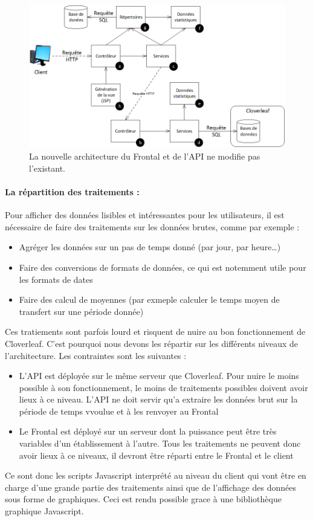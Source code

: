 			\begin{figure}[H]
				\centering
				\includegraphics[width=16cm]{../img/part3/archi_stats.png}
				\caption{\label{archi_stats} La nouvelle architecture du Frontal et de
				l'API ne modifie pas l'existant.}
			\end{figure}
			
			\paragraph{La répartition des traitements :}
			Pour afficher des données lisibles et intéressantes pour les utilisateurs, il
			est nécessaire de faire des traitements sur les données brutes, comme par
			exemple :
			\begin{itemize}
			  \item Agréger les données sur un pas de temps donné (par jour, par heure\ldots)
			  \item Faire des conversions de formats de données, ce qui est notemment
			  utile pour les formats de dates
			  \item Faire des calcul de moyennes (par exmeple calculer le temps moyen de
			  transfert sur une période donnée)
			\end{itemize}
			Ces tratiements sont parfois lourd et risquent de nuire au bon fonctionnement
			de Cloverleaf. C'est pourquoi nous devons les répartir sur les différents
			niveaux de l'architecture. Les contraintes sont les suivantes :
			\begin{itemize}
			  \item L'API est déployée sur le même serveur que Cloverleaf. Pour nuire le
			  moins possible à son fonctionnement, le moins de traitements possibles
			  doivent avoir lieux à ce niveau. L'API ne doit servir qu'a extraire les
			  données brut sur la période de temps vvoulue et à les renvoyer au Frontal
			  \item Le Frontal est déployé sur un serveur dont la puissance peut être
			  très variables d'un établissement à l'autre. Tous les traitements ne
			  peuvent donc avoir lieux à ce niveaux, il devront être réparti entre le
			  Frontal et le client
			\end{itemize}
			Ce sont donc les scripts Javascript interprété au niveau du client qui vont
			être en charge d'une grande partie des traitements ainsi que de l'affichage
			des données sous forme de graphiques. Ceci est rendu possible grace à une
			bibliothèque graphique Javascript.
			
